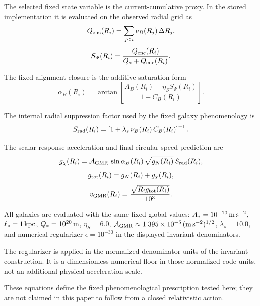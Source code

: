 ﻿\documentclass[twocolumn]{aastex701}
\begin{document}
The selected fixed state variable is the current-cumulative proxy. In the stored implementation it is evaluated on the observed radial grid as
\begin{equation}
Q_{\rm enc}(R_i) = \sum_{j\le i} \nu_B(R_j)\,\Delta R_j,
\end{equation}
\begin{equation}
S_\Psi(R_i) = \frac{Q_{\rm enc}(R_i)}{Q_* + Q_{\rm enc}(R_i)}.
\end{equation}

The fixed alignment closure is the additive-saturation form
\begin{equation}
\alpha_B(R_i) = \arctan\left[\frac{A_B(R_i) + \eta_S S_\Psi(R_i)}{1 + C_B(R_i)}\right].
\end{equation}

The internal radial suppression factor used by the fixed galaxy phenomenology is
\begin{equation}
S_{\rm rad}(R_i) = \left[1 + \lambda_s\,\nu_B(R_i)\,C_B(R_i)\right]^{-1}.
\end{equation}

The scalar-response acceleration and final circular-speed prediction are
\begin{equation}
g_\chi(R_i) = \mathcal{A}_{\rm GMR}\,\sin\alpha_B(R_i)\,\sqrt{g_N(R_i)}\,S_{\rm rad}(R_i),
\end{equation}
\begin{equation}
g_{\rm tot}(R_i) = g_N(R_i) + g_\chi(R_i),
\end{equation}
\begin{equation}
v_{\rm GMR}(R_i) = \frac{\sqrt{R_i g_{\rm tot}(R_i)}}{10^3}.
\end{equation}

All galaxies are evaluated with the same fixed global values: $A_* = 10^{-10}\,{\rm m\,s^{-2}}$, $\ell_* = 1\,{\rm kpc}$, $Q_* = 10^{20}\,{\rm m}$, $\eta_S = 6.0$, $\mathcal{A}_{\rm GMR} \approx 1.395\times10^{-5}\,(\mathrm{m\,s^{-2}})^{1/2}$, $\lambda_s = 10.0$, and numerical regularizer $\epsilon = 10^{-30}$ in the displayed invariant denominators.

The regularizer is applied in the normalized denominator units of the invariant construction. It is a dimensionless numerical floor in those normalized code units, not an additional physical acceleration scale.

These equations define the fixed phenomenological prescription tested here; they are not claimed in this paper to follow from a closed relativistic action.
\end{document}

